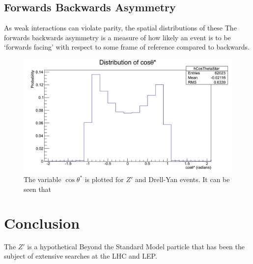 \documentclass{article}
\begin{document}
\subsection{Forwards Backwards Asymmetry}


As weak interactions can violate parity, the spatial distributions of these 
The forwards backwards asymmetry is a measure of how likely an event is to be `forwards facing' with respect to some frame of reference compared to backwards. 

\begin{figure}[h]
    \centering \includegraphics[scale=0.3]{images/cosThetaStar.png} \caption{The variable $\cos\theta^*$ is plotted for $Z'$ and Drell-Yan events. It can be seen that  \label{fig:cosTheta} }
\end{figure}

\section{Conclusion}
\label{sec:Conclusion}

The $Z'$ is a hypothetical Beyond the Standard Model particle that has been the subject of extensive searches at the LHC and LEP. 



\end{document}
